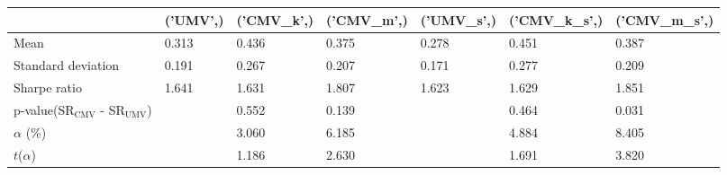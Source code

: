 \begin{tabular}{lllllll}
\toprule
 & ('UMV',) & ('CMV_k',) & ('CMV_m',) & ('UMV_s',) & ('CMV_k_s',) & ('CMV_m_s',) \\
\midrule
Mean & 0.313 & 0.436 & 0.375 & 0.278 & 0.451 & 0.387 \\
Standard deviation & 0.191 & 0.267 & 0.207 & 0.171 & 0.277 & 0.209 \\
Sharpe ratio & 1.641 & 1.631 & 1.807 & 1.623 & 1.629 & 1.851 \\
p-value(SR$_{\text{CMV}}$ - SR$_{\text{UMV}}$) &  & 0.552 & 0.139 &  & 0.464 & 0.031 \\
$\alpha$ (\%) &  & 3.060 & 6.185 &  & 4.884 & 8.405 \\
$t$($\alpha$) &  & 1.186 & 2.630 &  & 1.691 & 3.820 \\
\bottomrule
\end{tabular}

